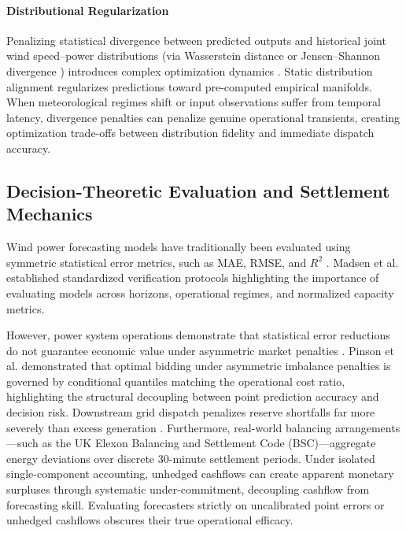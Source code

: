 \paragraph{Distributional Regularization} Penalizing statistical divergence between predicted outputs and historical joint wind speed--power distributions (via Wasserstein distance or Jensen--Shannon divergence \cite{pct2026,tgdpf2025}) introduces complex optimization dynamics \cite{krishnapriyan2021}. Static distribution alignment regularizes predictions toward pre-computed empirical manifolds. When meteorological regimes shift or input observations suffer from temporal latency, divergence penalties can penalize genuine operational transients, creating optimization trade-offs between distribution fidelity and immediate dispatch accuracy.

\subsection{Decision-Theoretic Evaluation and Settlement Mechanics}
Wind power forecasting models have traditionally been evaluated using symmetric statistical error metrics, such as MAE, RMSE, and $R^2$ \cite{madsen2005,zhang2014wind}. Madsen et al. \cite{madsen2005} established standardized verification protocols highlighting the importance of evaluating models across horizons, operational regimes, and normalized capacity metrics.

However, power system operations demonstrate that statistical error reductions do not guarantee economic value under asymmetric market penalties \cite{weron2014,zhang2014wind}. Pinson et al. \cite{pinson2007trading} demonstrated that optimal bidding under asymmetric imbalance penalties is governed by conditional quantiles matching the operational cost ratio, highlighting the structural decoupling between point prediction accuracy and decision risk. Downstream grid dispatch penalizes reserve shortfalls far more severely than excess generation \cite{morales2014,yan2025economicvalue}. Furthermore, real-world balancing arrangements---such as the UK Elexon Balancing and Settlement Code (BSC)---aggregate energy deviations over discrete 30-minute settlement periods. Under isolated single-component accounting, unhedged cashflows can create apparent monetary surpluses through systematic under-commitment, decoupling cashflow from forecasting skill. Evaluating forecasters strictly on uncalibrated point errors or unhedged cashflows obscures their true operational efficacy.


